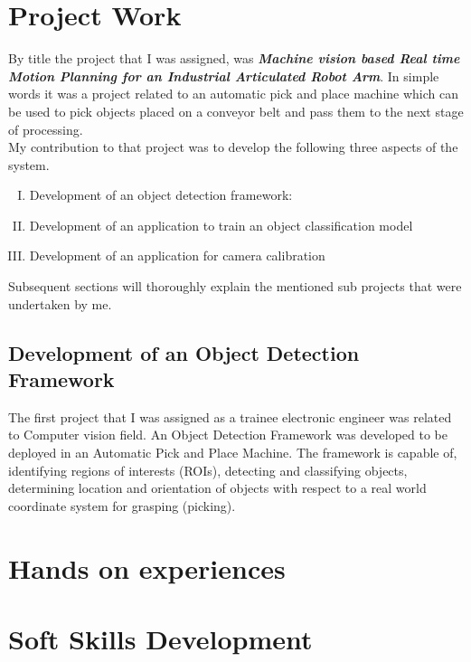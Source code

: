 \documentclass[a4paper,12pt]{report}%
\begin{document}
\chapter{Project Work}

By title the project that I was assigned, was \textbf{\textit{Machine vision based Real time Motion Planning for an Industrial Articulated Robot Arm}}. In simple words it was a project related to an automatic pick and place machine which can be used to pick objects placed on a conveyor belt and pass them to the next stage of processing.\\

My contribution to that project was to develop the following three aspects of the system. 

\begin{enumerate}[I.]
	\item Development of an object detection framework: 
	\item Development of an application to train an object classification model
	\item Development of an application for camera calibration
\end{enumerate}

Subsequent sections will thoroughly explain the mentioned sub projects that were undertaken by me.

\section{Development of an Object Detection Framework}

The first project that I was assigned as a trainee electronic engineer was related to Computer vision field. An Object Detection Framework was developed to be deployed in an Automatic Pick and Place Machine. The framework is capable of, identifying regions of interests (ROIs), detecting and classifying objects, determining location and orientation of objects with respect to a real world coordinate system for grasping (picking).

\chapter{Hands on experiences}

\chapter{Soft Skills Development}
\end{document}

